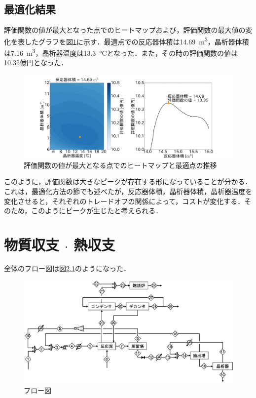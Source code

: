 \documentclass[a4j]{jsreport}
\begin{document}
\section{最適化結果}
評価関数の値が最大となった点でのヒートマップおよび，評価関数の最大値の変化を表したグラフを図\ref{最適化結果}に示す．最適点での反応器体積は14.69\, \si{\cubic \metre}，晶析器体積は7.16\, \si{\cubic \metre}，晶析器温度は13.3\, \si{\degreeCelsius}となった．また，その時の評価関数の値は10.35億円となった．
\begin{figure}[htbp]
  \centering
  \includegraphics[scale=0.1]{snapshot.png}
  \caption{評価関数の値が最大となる点でのヒートマップと最適点の推移}
  \label{最適化結果}
\end{figure}

このように，評価関数は大きなピークが存在する形になっていることが分かる．これは，最適化方法の節でも述べたが，反応器体積，晶析器体積，晶析器温度を変化させると，それぞれのトレードオフの関係によって，コストが変化する．そのため，このようにピークが生じたと考えられる．


\clearpage
\chapter{物質収支 $\cdot$ 熱収支}
全体のフロー図は図\ref{フロー図}のようになった．
\begin{figure}[htbp]
  \centering
  \includegraphics[scale=0.6]{mat_flow.png}
  \caption{フロー図}
  \label{フロー図}
\end{figure}
\end{document}
